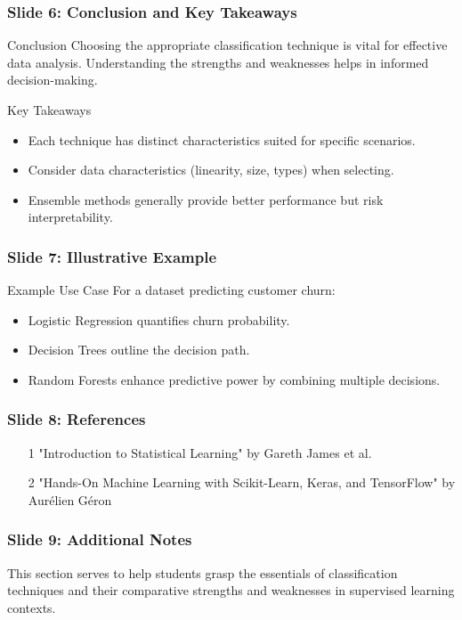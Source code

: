 \documentclass[aspectratio=169]{beamer}
\begin{document}
\begin{frame}[fragile]
    \frametitle{Slide 6: Conclusion and Key Takeaways}
    \begin{block}{Conclusion}
        Choosing the appropriate classification technique is vital for effective data analysis. Understanding the strengths and weaknesses helps in informed decision-making.
    \end{block}
    \begin{block}{Key Takeaways}
        \begin{itemize}
            \item Each technique has distinct characteristics suited for specific scenarios.
            \item Consider data characteristics (linearity, size, types) when selecting.
            \item Ensemble methods generally provide better performance but risk interpretability.
        \end{itemize}
    \end{block}
\end{frame}

\begin{frame}[fragile]
    \frametitle{Slide 7: Illustrative Example}
    \begin{block}{Example Use Case}
        For a dataset predicting customer churn:
        \begin{itemize}
            \item Logistic Regression quantifies churn probability.
            \item Decision Trees outline the decision path.
            \item Random Forests enhance predictive power by combining multiple decisions.
        \end{itemize}
    \end{block}
\end{frame}

\begin{frame}[fragile]
    \frametitle{Slide 8: References}
    \begin{itemize}
        \item [1] "Introduction to Statistical Learning" by Gareth James et al.
        \item [2] "Hands-On Machine Learning with Scikit-Learn, Keras, and TensorFlow" by Aurélien Géron
    \end{itemize}
\end{frame}

\begin{frame}[fragile]
    \frametitle{Slide 9: Additional Notes}
    This section serves to help students grasp the essentials of classification techniques and their comparative strengths and weaknesses in supervised learning contexts.
\end{frame}
\end{document}
